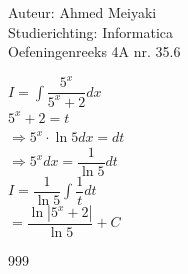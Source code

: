 \documentclass[a4paper]{article}
\begin{document}
  
\noindent \large Auteur: Ahmed Meiyaki \\
\noindent \large Studierichting: Informatica\\
\noindent \large Oefeningenreeks 4A nr. 35.6\\

\medskip

\normalsize

$I = \displaystyle\int \dfrac{5^x}{5^x + 2} dx $\\

$ 5^x + 2 = t $\\

$\Rightarrow 5^x \cdot \ln5 dx = dt $\\

$\Rightarrow 5^x dx = \dfrac{1}{\ln5}dt $\\

$I = \dfrac{1}{\ln5} \displaystyle\int \dfrac{1}{t} dt $\\

$= \dfrac{\ln|5^x + 2|}{\ln5} + C $\\







\begin{thebibliography}{999}
\end{thebibliography}
\end{document}

